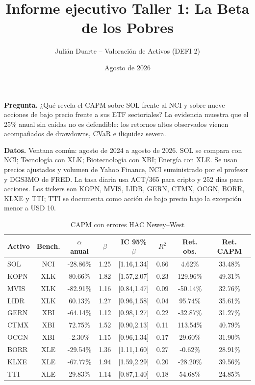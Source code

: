 \documentclass[10pt,a4paper]{article}
\title{\vspace{-1.2cm}\textbf{Informe ejecutivo Taller 1: La Beta de los Pobres}}
\author{Julián Duarte -- Valoración de Activos (DEFI 2)}
\date{Agosto de 2026}
\begin{document}
\maketitle
\textbf{Pregunta.} ¿Qué revela el CAPM sobre SOL frente al NCI y sobre nueve acciones de bajo precio frente a sus ETF sectoriales? La evidencia muestra que el 25\% anual sin caídas no es defendible: los retornos altos observados vienen acompañados de drawdowns, CVaR e iliquidez severa.

\textbf{Datos.} Ventana común: agosto de 2024 a agosto de 2026. SOL se compara con NCI; Tecnología con XLK; Biotecnología con XBI; Energía con XLE. Se usan precios ajustados y volumen de Yahoo Finance, NCI suministrado por el profesor y DGS3MO de FRED. La tasa diaria usa ACT/365 para cripto y 252 días para acciones. Los tickers son KOPN, MVIS, LIDR, GERN, CTMX, OCGN, BORR, KLXE y TTI; TTI se documenta como acción de bajo precio bajo la excepción menor a USD 10.

\begin{table}[H]\centering\scriptsize
\caption{CAPM con errores HAC Newey--West}
\begin{tabular}{lccccccc}\toprule
Activo & Bench. & $\alpha$ anual & $\beta$ & IC 95\% $\beta$ & $R^2$ & Ret. obs. & Ret. CAPM\\\midrule
SOL & NCI & -28.86\% & 1.25 & [1.16,1.34] & 0.66 & 4.62\% & 33.48\% \\
KOPN & XLK & 80.66\% & 1.82 & [1.57,2.07] & 0.23 & 129.96\% & 49.31\% \\
MVIS & XLK & -82.91\% & 1.16 & [0.84,1.47] & 0.09 & -50.14\% & 32.76\% \\
LIDR & XLK & 60.13\% & 1.27 & [0.96,1.58] & 0.04 & 95.74\% & 35.61\% \\
GERN & XBI & -64.14\% & 1.12 & [0.98,1.27] & 0.22 & -32.87\% & 31.27\% \\
CTMX & XBI & 72.75\% & 1.52 & [0.90,2.13] & 0.11 & 113.54\% & 40.79\% \\
OCGN & XBI & -2.30\% & 1.15 & [0.96,1.34] & 0.17 & 29.60\% & 31.90\% \\
BORR & XLE & -29.54\% & 1.36 & [1.11,1.60] & 0.27 & -0.62\% & 28.91\% \\
KLXE & XLE & -67.77\% & 1.94 & [1.59,2.29] & 0.20 & -28.20\% & 39.56\% \\
TTI & XLE & 29.83\% & 1.14 & [0.87,1.40] & 0.18 & 54.68\% & 24.85\% \\
\bottomrule\end{tabular}\end{table}
\end{document}
